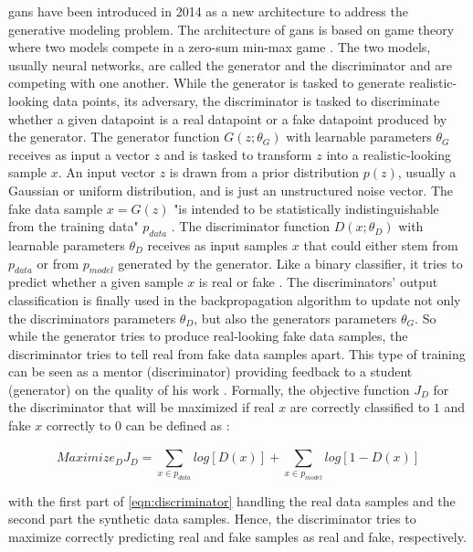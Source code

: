 \Glspl{gan} \cite{NIPS2014_5ca3e9b1} have been introduced in 2014 as a new architecture to address the generative modeling problem.
The architecture of \glspl{gan} is based on game theory where two models compete in a zero-sum min-max game \cite{NIPS2014_5ca3e9b1, zhao2022CTABGANEnhancingTabular}.
The two models, usually neural networks, are called the generator and the discriminator and are competing with one another.
While the generator is tasked to generate realistic-looking data points, its adversary, the discriminator is tasked to discriminate whether a given datapoint is a real datapoint or a fake datapoint produced by the generator.
The generator function $G(z;\theta_G)$ with learnable parameters $\theta_G$ receives as input a vector $z$ and is tasked to transform $z$ into a realistic-looking sample $x$.
An input vector $z$ is drawn from a prior distribution $p(z)$, usually a Gaussian or uniform distribution, and is just an unstructured noise vector.
The fake data sample $x=G(z)$ "is intended to be statistically indistinguishable from the training data" $p_{data}$ \cite[p. 141]{goodfellow2020GenerativeAdversarialNetworks}.
The discriminator function $D(x;\theta_D)$ with learnable parameters $\theta_D$ receives as input samples $x$ that could either stem from $p_{data}$ or from $p_{model}$ generated by the generator.
Like a binary classifier, it tries to predict whether a given sample $x$ is real or fake \cite{NIPS2014_5ca3e9b1}.
The discriminators' output classification is finally used in the backpropagation algorithm to update not only the discriminators parameters $\theta_D$, but also the generators parameters $\theta_G$.
So while the generator tries to produce real-looking fake data samples, the discriminator tries to tell real from fake data samples apart. 
This type of training can be seen as a mentor (discriminator) providing feedback to a student (generator) on the quality of his work \cite{zhao2022CTABGANEnhancingTabular}.
Formally, the objective function $J_D$ for the discriminator that will be maximized if real $x$ are correctly classified to $1$ and fake $x$ correctly to $0$ can be defined as \cite{aggarwal2018NeuralNetworksDeep}:

\begin{equation}
    \label{eqn:discriminator}
    Maximize_DJ_D= \sum_{x\in p_{data}}^{} log [D(x)] + \sum_{x\in p_{model}}^{} log [1-D(x)]
\end{equation}

with the first part of \autoref{eqn:discriminator} handling the real data samples and the second part the synthetic data samples.
Hence, the discriminator tries to maximize correctly predicting real and fake samples as real and fake, respectively.

